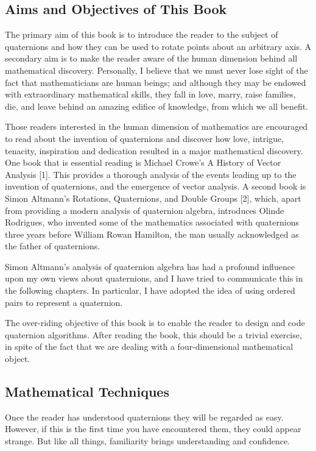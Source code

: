 \documentclass[10pt]{article}
\begin{document}
\subsection{Aims and Objectives of This Book}
The primary aim of this book is to introduce the reader to the subject of quaternions and how they can be used to rotate points about an arbitrary axis. A secondary aim is to make the reader aware of the human dimension behind all mathematical discovery. Personally, I believe that we must never lose sight of the fact that mathematicians are human beings; and although they may be endowed with extraordinary mathematical skills, they fall in love, marry, raise families, die, and leave behind an amazing edifice of knowledge, from which we all benefit.

Those readers interested in the human dimension of mathematics are encouraged to read about the invention of quaternions and discover how love, intrigue, tenacity, inspiration and dedication resulted in a major mathematical discovery. One book that is essential reading is Michael Crowe's A History of Vector Analysis [1]. This provides a thorough analysis of the events leading up to the invention of quaternions, and the emergence of vector analysis. A second book is Simon Altmann's Rotations, Quaternions, and Double Groups [2], which, apart from providing a modern analysis of quaternion algebra, introduces Olinde Rodrigues, who invented some of the mathematics associated with quaternions three years before William Rowan Hamilton, the man usually acknowledged as the father of quaternions.

Simon Altmann's analysis of quaternion algebra has had a profound influence upon my own views about quaternions, and I have tried to communicate this in the following chapters. In particular, I have adopted the idea of using ordered pairs to represent a quaternion.

The over-riding objective of this book is to enable the reader to design and code quaternion algorithms. After reading the book, this should be a trivial exercise, in spite of the fact that we are dealing with a four-dimensional mathematical object.

\subsection{Mathematical Techniques}
Once the reader has understood quaternions they will be regarded as easy. However, if this is the first time you have encountered them, they could appear strange. But like all things, familiarity brings understanding and confidence.
\end{document}
